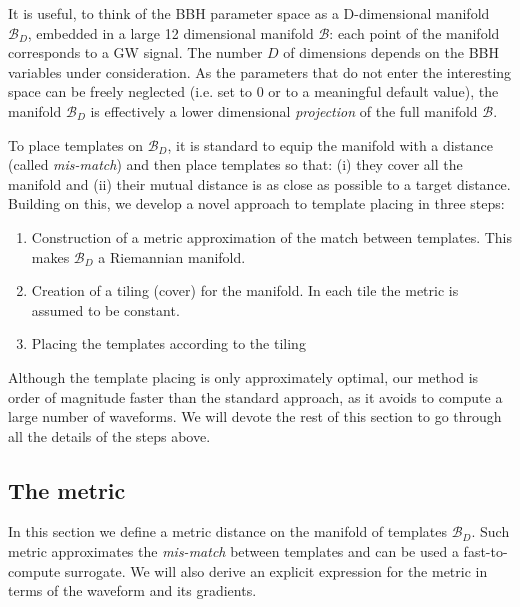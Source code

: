 \documentclass[twocolumn,showpacs,preprintnumbers,nofootinbib,prd,
superscriptaddress,10pt]{revtex4-2}
\begin{document}
It is useful, to think of the BBH parameter space as a D-dimensional manifold $\mathcal{B}_D$, embedded in a large 12 dimensional manifold $\mathcal{B}$: each point of the manifold corresponds to a GW signal. The number $D$ of dimensions depends on the BBH variables under consideration.
As the parameters that do not enter the interesting space can be freely neglected (i.e. set to $0$ or to a meaningful default value), the manifold $\mathcal{B}_D$ is effectively a lower dimensional {\it projection} of the full manifold $\mathcal{B}$.

%
To place templates on $\mathcal{B}_D$, it is standard to equip the manifold with a distance (called {\it mis-match}) and then place templates so that: (i) they cover all the manifold and (ii) their mutual distance is as close as possible to a target distance.
Building on this, we develop a novel approach to template placing in three steps:

\begin{enumerate}
	\item Construction of a metric approximation of the match between templates. This makes $\mathcal{B}_D$ a Riemannian manifold.
	\item Creation of a tiling (cover) for the manifold. In each tile the metric is assumed to be constant.
	\item Placing the templates according to the tiling
\end{enumerate}

Although the template placing is only approximately optimal, our method is order of magnitude faster than the standard approach, as it avoids to compute a large number of waveforms.
We will devote the rest of this section to go through all the details of the steps above.

\subsection{The metric} \label{sec:metric}

In this section we define a metric distance on the manifold of templates $\mathcal{B}_D$. Such metric approximates the {\it mis-match} between templates and can be used a fast-to-compute surrogate. We will also derive an explicit expression for the metric in terms of the waveform and its gradients.
\end{document}
